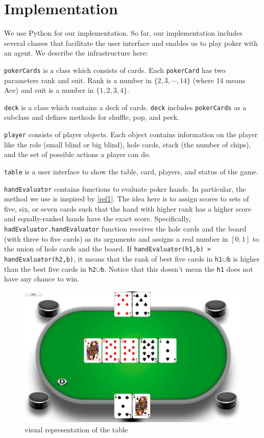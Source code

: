  
\section{Implementation}
We use Python for our implementation. So far, our implementation includes several classes
that facilitate the user interface and enables us to play poker with an agent. We describe the
infrastructure here:

\BIT
\item {\tt pokerCards} is a class which consists of cards. Each {\tt pokerCard} has 
two parameters rank and suit.
Rank is a number in $\{2,3,\cdots,14\}$ (where 14 means Ace) and suit is a number in 
$\{1,2,3,4\}$.
\item {\tt deck} is a class which contains a deck of cards. {\tt deck} includes 
{\tt pokerCards} as a subclass and defines methods for shuffle, pop, and peek.
\item {\tt player} consists of player objects. Each object contains information on the player like
the role (small blind or big blind), hole cards, stack (the number of chips), and the set of
possible actions a player can do.
\item {\tt table} is a user interface to show the table, card, players, and status of the game.
\item {\tt handEvaluator} contains functions to evaluate poker hands.
In particular, the method we use is inspired by \ref{ref1}. The idea here is to assign scores to sets of
five, six, or seven cards such that the hand with higher rank has a higher score and equally-ranked
hands have the exact score. Specifically, {\tt hadEvaluator.handEvaluator} function 
receives the hole cards and  
the board (with three to five cards) as its arguments and assigns a real number in $[0,1]$
to the union of hole cards and the board. If {\tt handEvaluator(h1,b) > handEvaluator(h2,b)},
it means that the rank of best five cards in {\tt h1$\cup$b} is higher than the best five cards
in {\tt h2$\cup$b}. Notice that this doesn't mean the {\tt h1} does not have any chance to win.
\EIT
\begin{figure}[h!]
  	\centering
 	\includegraphics[scale = .3]{table}
	\caption{visual representation of the table}
\end{figure}

